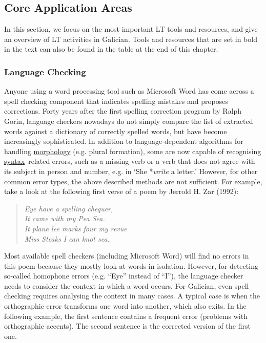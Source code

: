 \begin{multicols}{2}
\begin{itemize}
\begin{multicols}{2}
\subsection{Core Application Areas}

    In this section, we focus on the most important LT tools and resources, and give an overview of LT activities in Galician. Tools and resources that are set in bold in the text can also be found in the table at the end of this chapter.

\subsubsection{Language Checking}

Anyone using a word processing tool such as Microsoft Word has come across a spell checking component that indicates spelling mistakes and proposes corrections. Forty years after the first spelling correction program by Ralph Gorin, language checkers nowadays do not simply compare the list of extracted words against a dictionary of correctly spelled words, but have become increasingly sophisticated.  In addition to language-dependent algorithms for handling \uline{mor\-pho\-lo\-gy} (e.g. plural formation), some are now capable of recognising \uline{syntax}–related errors, such as a missing verb or a verb that does not agree with its subject in person and number, e.g. in ‘She *\textit{write} a letter.’ However, for other common error types, the above described methods are not sufficient. For example, take a look at the following first verse of a poem by Jerrold H. Zar (1992): 

\begin{verse}
\textit{Eye have a spelling chequer,} \\
\textit{It came with my Pea Sea.} \\
\textit{It plane lee marks four my revue} \\
\textit{Miss Steaks I can knot sea.}
\end{verse}

Most available spell checkers (including Microsoft Word) will find no errors in this poem because they mostly look at words in isolation. However, for detecting so-called homophone errors (e.g. “Eye” instead of “I”), the language checker needs to consider the context in which a word occurs. For Galician, even spell checking requires analysing the context in many cases. A typical case is when the orthographic error transforms one word into another, which also exits. In the following example, the first sentence contains a frequent error (problems with orthographic accents). The second sentence is the corrected version of the first one.


\end{multicols}
\end{itemize}
\end{multicols}
